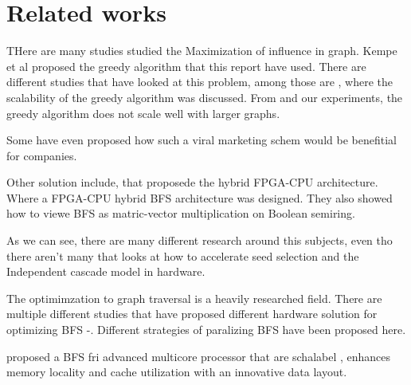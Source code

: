 \chapter{Related works}
THere are many studies studied the Maximization of influence in graph\cite{MaximizeSpread2003}.  Kempe et al proposed the greedy algorithm that this report have used. There are different studies that have looked at this problem, among those are \cite{InfluenceMax}, where the scalability of the greedy algorithm was discussed. From \cite{InfluenceMax} and our experiments, the greedy algorithm does not scale well with larger graphs. 

Some have even proposed how such a viral marketing schem would be benefitial for companies.

Other solution include\cite{HybridBFS2015}, that proposede the hybrid FPGA-CPU architecture. Where a FPGA-CPU hybrid BFS architecture was designed. They also showed how to viewe BFS as matric-vector multiplication on Boolean semiring. 

As we can see, there are many different research around this subjects, even tho there aren't many that looks at how to accelerate seed selection and the Independent cascade model in hardware.


The optimimzation to graph traversal is a heavily researched field. There are multiple different studies that have proposed different hardware solution for optimizing BFS \cite{ScalabelGraphEx}-\cite{DirectOptimizeBFS}. Different strategies of paralizing BFS have been proposed here\cite{ParallelBFS2011}. 

\cite{ScalableGraphex} proposed a BFS fri advanced multicore processor that are schalabel , enhances memory locality and cache utilization with an innovative data layout.

\cite{}
